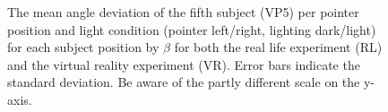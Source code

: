 \begin{figure}
    \caption{The mean angle deviation of the fifth subject (VP5) per pointer position and light condition (pointer left/right, lighting dark/light) for each subject position by $\beta$ for both the real life experiment (RL) and the virtual reality experiment (VR). Error bars indicate the standard deviation. Be aware of the partly different scale on the y-axis.} 
    \label{DeviationBOTHVP5}
\end{figure}













